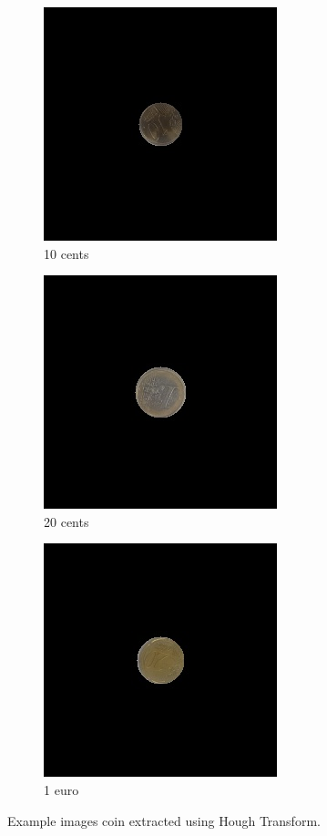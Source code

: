 \documentclass[10pt,journal,compsoc]{IEEEtran}
\begin{document}
\begin{figure}[h]
\centering
\begin{subfigure}[b]{0.15\textwidth}
\includegraphics[scale=0.3]{output_0010_0}
\caption{10 cents}
\end{subfigure}
\begin{subfigure}[b]{0.15\textwidth}
\includegraphics[scale=0.3]{output_0005_1}
\caption{20 cents}
\end{subfigure}
\begin{subfigure}[b]{0.15\textwidth}
\includegraphics[scale=0.3]{output_0001_2}
\caption{1 euro}
\end{subfigure}
\label{fig:figure2}
\caption{Example images coin extracted using Hough Transform.}
\end{figure}
\end{document}
